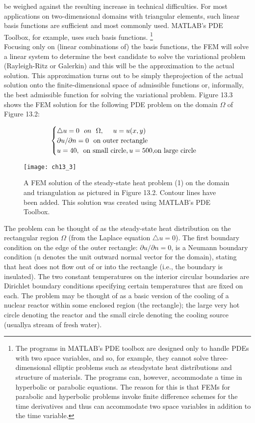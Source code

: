 \documentclass[../main.tex]{subfiles}
\begin{document}
be weighed against the resulting increase in technical difficulties. For most 
applications on two-dimensional domains with triangular elements, such linear 
basis functions are sufficient and most commonly used. MATLAB's PDE Toolbox, for example, uses such basis functions.
\footnote{The programs in MATLAB's PDE toolbox are designed only to handle PDEs with two space 
variables, and so, for example, they cannot solve three-dimensional elliptic problems such as steadystate heat distributions and structure of materials. The programs can, however, accommodate a time  in hyperbolic or parabolic equations. The reason for this is that FEMs for parabolic and hyperbolic problems invoke finite difference schemes for the time derivatives and thus can accommodate two space variables in addition to the time variable. }
\\
Focusing only on (linear combinations of) the basis functions, the FEM will solve 
a linear system to determine the best candidate to solve the variational problem 
(Rayleigh-Ritz or Galerkin) and this will be the approximation to the actual solution. This approximation turns out to be simply theprojection of the actual solution onto the finite-dimensional space of admissible functions or, informally, the best admissible function for solving the variational problem. Figure 13.3 shows the FEM solution for the following PDE problem on the domain $\Omega$ of 
Figure 13.2: 

\begin{equation}
\begin{cases}
\bigtriangleup u=0~~on~~\Omega, ~~~~u=u(x,y)\\
		\partial u/\partial n=0 ~~$on outer rectangle$\\
		u=40, ~~ $on small circle$, u = 500 , $on large circle$
\end{cases}
\end{equation}

\begin{figure}[H]
	\centering
	\texttt{[image: ch13\_3]}
	\caption{\textsf{A FEM solution of the steady-state heat problem (1) on the domain and triangulation as pictured in Figure 13.2. Contour lines have been added. This solution was created using MATLAB's PDE Toolbox.}}
	\label{pfig:ch13_3}
\end{figure}

The problem can be thought of as the steady-state heat distribution on the rectangular region $\Omega$ (from the Laplace equation $\bigtriangleup u = 0$). The first boundary condition on the edge of the outer rectangle: $\partial u /\partial n=0$, is a Neumann boundary condition (n denotes the unit outward normal vector for the domain), stating that heat does not flow out of or into the rectangle (i.e., the boundary is insulated). The two constant temperatures on the interior circular boundaries are Dirichlet boundary conditions specifying certain temperatures that are fixed on each. The problem may be thought of as a basic version of the cooling of a nuclear reactor within some enclosed region (the rectangle); the large very hot circle denoting the reactor and the small circle denoting the cooling source (usuallya stream of fresh water). 
\\
\end{document}
